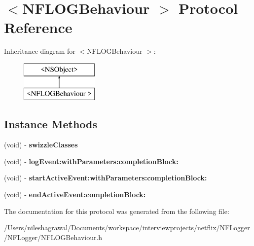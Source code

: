 \hypertarget{protocol_n_f_l_o_g_behaviour_01-p}{}\section{$<$N\+F\+L\+O\+G\+Behaviour $>$ Protocol Reference}
\label{protocol_n_f_l_o_g_behaviour_01-p}
Inheritance diagram for $<$N\+F\+L\+O\+G\+Behaviour $>$\+:\begin{figure}[H]
\begin{center}
\leavevmode
\includegraphics[height=2.000000cm]{protocol_n_f_l_o_g_behaviour_01-p}
\end{center}
\end{figure}
\subsection*{Instance Methods}
\begin{DoxyCompactItemize}
\item 
\mbox{\label{protocol_n_f_l_o_g_behaviour_01-p_ab0e50ce3a4a91cba687eec9cd21e9a78}} 
(void) -\/ {\bfseries swizzle\+Classes}
\item 
\mbox{\label{protocol_n_f_l_o_g_behaviour_01-p_afcac3d44d23654909ae1da3ee5c61840}} 
(void) -\/ {\bfseries log\+Event\+:with\+Parameters\+:completion\+Block\+:}
\item 
\mbox{\label{protocol_n_f_l_o_g_behaviour_01-p_a33b7f90b7f9108d33592e0916f5503f5}} 
(void) -\/ {\bfseries start\+Active\+Event\+:with\+Parameters\+:completion\+Block\+:}
\item 
\mbox{\label{protocol_n_f_l_o_g_behaviour_01-p_a040b1fc4ce9a3e52b89043fd49d86409}} 
(void) -\/ {\bfseries end\+Active\+Event\+:completion\+Block\+:}
\end{DoxyCompactItemize}


The documentation for this protocol was generated from the following file\+:\begin{DoxyCompactItemize}
\item 
/\+Users/nileshagrawal/\+Documents/workspace/interviewprojects/netflix/\+N\+F\+Logger/\+N\+F\+Logger/N\+F\+L\+O\+G\+Behaviour.\+h\end{DoxyCompactItemize}
